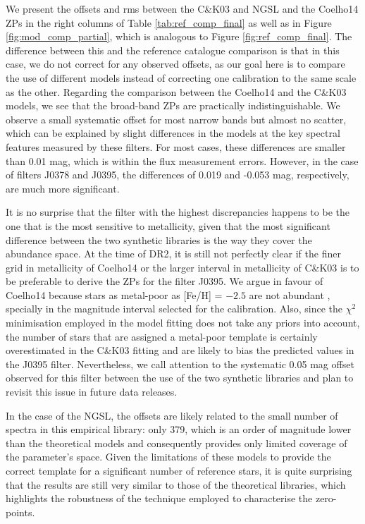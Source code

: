 \documentclass[fleqn,usenatbib]{mnras}
\begin{document}
We present the offsets and rms between the C\&K03 and NGSL and the Coelho14 ZPs in the right columns of Table \ref{tab:ref_comp_final} as well as in Figure \ref{fig:mod_comp_partial}, which is analogous to Figure \ref{fig:ref_comp_final}. The difference between this and the reference catalogue comparison is that in this case, we do not correct for any observed offsets, as our goal here is to compare the use of different models instead of correcting one calibration to the same scale as the other. Regarding the comparison between the Coelho14 and the C\&K03 models, we see that the broad-band ZPs are practically indistinguishable. We observe a small systematic offset for most narrow bands but almost no scatter, which can be explained by slight differences in the models at the key spectral features measured by these filters. For most cases, these differences are smaller than 0.01 mag, which is within the flux measurement errors. However, in the case of filters J0378 and J0395, the differences of 0.019 and -0.053 mag, respectively, are much more significant.

It is no surprise that the filter with the highest discrepancies happens to be the one that is the most sensitive to metallicity, given that the most significant difference between the two synthetic libraries is the way they cover the abundance space. At the time of DR2, it is still not perfectly clear if the finer grid in metallicity of Coelho14 or the larger interval in metallicity of C\&K03 is to be preferable to derive the ZPs for the filter J0395. We argue in favour of Coelho14 because stars as metal-poor as [Fe/H] = $-2.5$ are not abundant \citep{Beers+2005}, specially in the magnitude interval selected for the calibration. Also, since the $\chi^2$ minimisation employed in the model fitting does not take any priors into account, the number of stars that are assigned a metal-poor template is certainly overestimated in the C\&K03 fitting and are likely to bias the predicted values in the J0395 filter. Nevertheless, we call attention to the systematic 0.05 mag offset observed for this filter between the use of the two synthetic libraries and plan to revisit this issue in future data releases. 

In the case of the NGSL, the offsets are likely related to the small number of spectra in this empirical library: only 379, which is an order of magnitude lower than the theoretical models and consequently provides only limited coverage of the parameter's space. Given the limitations of these models to provide the correct template for a significant number of reference stars, it is quite surprising that the results are still very similar to those of the theoretical libraries, which highlights the robustness of the technique employed to characterise the zero-points.
\end{document}
